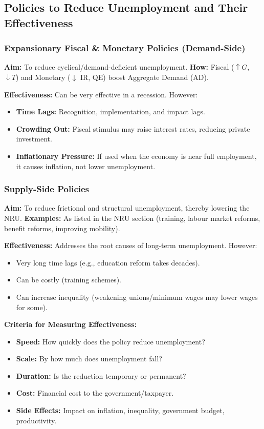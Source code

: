 \documentclass[11pt, a4paper, twoside]{book}
\begin{document}
\subsection{Policies to Reduce Unemployment and Their Effectiveness}

\subsubsection{Expansionary Fiscal \& Monetary Policies (Demand-Side)}

\textbf{Aim:} To reduce cyclical/demand-deficient unemployment. \textbf{How:} Fiscal ($\uparrow G$, $\downarrow T$) and Monetary ($\downarrow$ IR, QE) boost Aggregate Demand (AD).

\textbf{Effectiveness:} Can be very effective in a recession. However:
\begin{itemize}
  \item \textbf{Time Lags:} Recognition, implementation, and impact lags.
  \item \textbf{Crowding Out:} Fiscal stimulus may raise interest rates, reducing private investment.
  \item \textbf{Inflationary Pressure:} If used when the economy is near full employment, it causes inflation, not lower unemployment.
\end{itemize}

\subsubsection{Supply-Side Policies}

\textbf{Aim:} To reduce frictional and structural unemployment, thereby lowering the NRU. \textbf{Examples:} As listed in the NRU section (training, labour market reforms, benefit reforms, improving mobility).

\textbf{Effectiveness:} Addresses the root causes of long-term unemployment. However:
\begin{itemize}
  \item Very long time lags (e.g., education reform takes decades).
  \item Can be costly (training schemes).
  \item Can increase inequality (weakening unions/minimum wages may lower wages for some).
\end{itemize}

\textbf{Criteria for Measuring Effectiveness:}
\begin{itemize}
  \item \textbf{Speed:} How quickly does the policy reduce unemployment?
  \item \textbf{Scale:} By how much does unemployment fall?
  \item \textbf{Duration:} Is the reduction temporary or permanent?
  \item \textbf{Cost:} Financial cost to the government/taxpayer.
  \item \textbf{Side Effects:} Impact on inflation, inequality, government budget, productivity.
\end{itemize}
\end{document}
